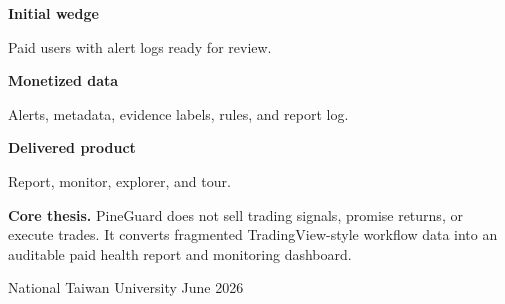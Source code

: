 \documentclass[11pt,a4paper]{article}
\begin{document}
\begin{titlepage}
\vspace{2.55cm}
\noindent
\begin{minipage}[t]{0.31\textwidth}
\begin{tcolorbox}[enhanced,colback=white,colframe=Border,boxrule=0.45pt,arc=3mm,left=2.5mm,right=2.5mm,top=2mm,bottom=2mm,height=3.15cm]
{\sffamily\bfseries\color{Green}Initial wedge}\par\vspace{0.12cm}
{\sffamily\small \raggedright{} Paid users with alert logs ready for review.}
\end{tcolorbox}
\end{minipage}\hfill
\begin{minipage}[t]{0.31\textwidth}
\begin{tcolorbox}[enhanced,colback=white,colframe=Border,boxrule=0.45pt,arc=3mm,left=2.5mm,right=2.5mm,top=2mm,bottom=2mm,height=3.15cm]
{\sffamily\bfseries\color{Green}Monetized data}\par\vspace{0.12cm}
{\sffamily\small \raggedright{} Alerts, metadata, evidence labels, rules, and report log.}
\end{tcolorbox}
\end{minipage}\hfill
\begin{minipage}[t]{0.31\textwidth}
\begin{tcolorbox}[enhanced,colback=white,colframe=Border,boxrule=0.45pt,arc=3mm,left=2.5mm,right=2.5mm,top=2mm,bottom=2mm,height=3.15cm]
{\sffamily\bfseries\color{Green}Delivered product}\par\vspace{0.12cm}
{\sffamily\small \raggedright{} Report, monitor, explorer, and tour.}
\end{tcolorbox}
\end{minipage}

\vfill
\begin{claimbox}
\sffamily\textbf{Core thesis.} PineGuard does not sell trading signals, promise returns, or execute trades. It converts fragmented TradingView-style workflow data into an auditable paid health report and monitoring dashboard.
\end{claimbox}
\vspace{0.55cm}
{\sffamily\small\color{Slate}National Taiwan University \hfill June 2026}\par
\end{titlepage}
\end{document}
